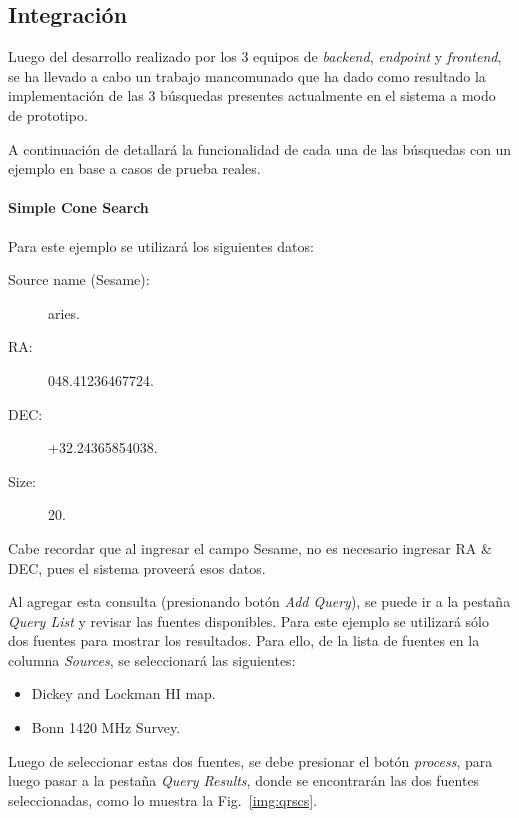 \subsection{Integración}

Luego del desarrollo realizado por los 3 equipos de \emph{backend},
\emph{endpoint} y \emph{frontend}, se ha llevado a cabo un trabajo
mancomunado que ha dado como resultado la implementación de las 3
búsquedas presentes actualmente en el sistema a modo de prototipo.

A continuación de detallará la funcionalidad de cada una de las
búsquedas con un ejemplo en base a casos de prueba reales.

\paragraph{Simple Cone Search}

Para este ejemplo se utilizará los siguientes datos:

\begin{description}
  \item [Source name (Sesame):] aries.
  \item [RA:] 048.41236467724.
  \item [DEC:] +32.24365854038.
  \item [Size:] 20.
\end{description}

Cabe recordar que al ingresar el campo Sesame, no es necesario
ingresar RA \& DEC, pues el sistema proveerá esos datos.

Al agregar esta consulta (presionando botón \emph{Add Query}), se puede
ir a la pestaña \emph{Query List} y revisar las fuentes disponibles.
Para este ejemplo se utilizará sólo dos fuentes para mostrar los
resultados. Para ello, de la lista de fuentes en la columna
\emph{Sources}, se seleccionará las siguientes:

\begin{itemize}
  \item Dickey and Lockman HI map.
  \item Bonn 1420 MHz Survey.
\end{itemize}

Luego de seleccionar estas dos fuentes, se debe presionar el botón
\emph{process}, para luego pasar a la pestaña \emph{Query Results},
donde se encontrarán las dos fuentes seleccionadas, como lo muestra la
Fig.~\ref{img:qrscs}.

